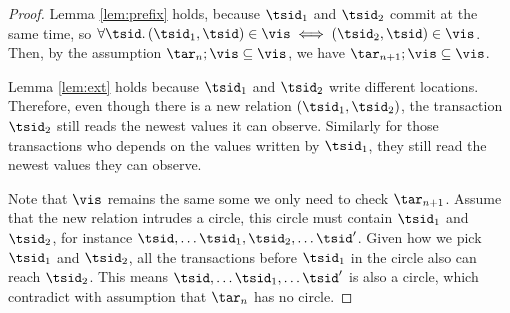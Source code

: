 \begin{proof}
    Lemma \ref{lem:prefix}  holds, because \( \tsid_{1} \) and \( \tsid_{2} \) commit at the same time, so \( \forall \tsid \ldotp (\tsid_{1}, \tsid) \in \vis \iff  (\tsid_{2}, \tsid) \in \vis \).
    Then, by the assumption \( \tar_{n} ; \vis \subseteq \vis \), we have \( \tar_{n+1} ; \vis \subseteq \vis \).

    Lemma \ref{lem:ext} holds because \( \tsid_{1} \) and \( \tsid_{2} \) write different locations.
    Therefore, even though there is a new relation \( (\tsid_{1}, \tsid_{2}) \), the transaction \( \tsid_{2} \) still reads the newest values it can observe.
    Similarly for those transactions who depends on the values written by \( \tsid_{1} \), they still read the newest values they can observe.
                                                   
    Note that \( \vis \) remains the same some we only need to check \( \tar_{n+1} \).
    Assume that the new relation intrudes a circle, this circle must contain \( \tsid_{1} \) and \( \tsid_{2} \), for instance \( \tsid, \dots \tsid_{1}, \tsid_{2}, \dots \tsid' \).
    Given how we pick \( \tsid_{1} \) and \( \tsid_{2} \), all the transactions before \( \tsid_{1} \) in the circle also can reach \( \tsid_{2} \).
    This means \( \tsid, \dots \tsid_{1}, \dots \tsid' \) is also a circle, which contradict with assumption that \( \tar_{n} \) has no circle.
\end{proof}

